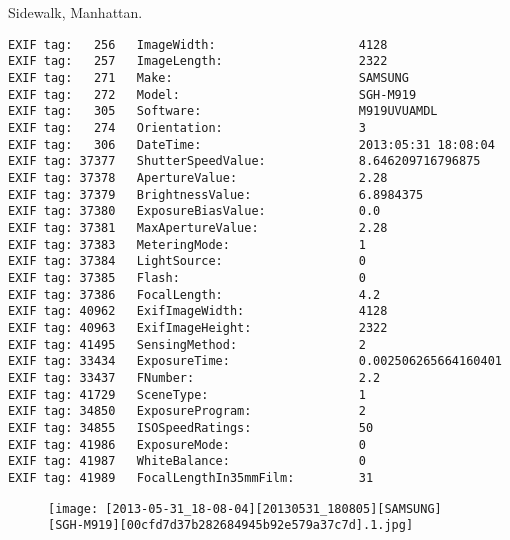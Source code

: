 \section{\protect{}}
\noindent Sidewalk, Manhattan.
\noindent
\begin{lstlisting}
EXIF tag:   256   ImageWidth:                    4128
EXIF tag:   257   ImageLength:                   2322
EXIF tag:   271   Make:                          SAMSUNG
EXIF tag:   272   Model:                         SGH-M919
EXIF tag:   305   Software:                      M919UVUAMDL
EXIF tag:   274   Orientation:                   3
EXIF tag:   306   DateTime:                      2013:05:31 18:08:04
EXIF tag: 37377   ShutterSpeedValue:             8.646209716796875
EXIF tag: 37378   ApertureValue:                 2.28
EXIF tag: 37379   BrightnessValue:               6.8984375
EXIF tag: 37380   ExposureBiasValue:             0.0
EXIF tag: 37381   MaxApertureValue:              2.28
EXIF tag: 37383   MeteringMode:                  1
EXIF tag: 37384   LightSource:                   0
EXIF tag: 37385   Flash:                         0
EXIF tag: 37386   FocalLength:                   4.2
EXIF tag: 40962   ExifImageWidth:                4128
EXIF tag: 40963   ExifImageHeight:               2322
EXIF tag: 41495   SensingMethod:                 2
EXIF tag: 33434   ExposureTime:                  0.002506265664160401
EXIF tag: 33437   FNumber:                       2.2
EXIF tag: 41729   SceneType:                     1
EXIF tag: 34850   ExposureProgram:               2
EXIF tag: 34855   ISOSpeedRatings:               50
EXIF tag: 41986   ExposureMode:                  0
EXIF tag: 41987   WhiteBalance:                  0
EXIF tag: 41989   FocalLengthIn35mmFilm:         31

\end{lstlisting}
\clearpage
\begin{figure}
\raggedleft
\texttt{[image: [2013-05-31\_18-08-04][20130531\_180805][SAMSUNG][SGH-M919][00cfd7d37b282684945b92e579a37c7d].1.jpg]}
\end{figure}


\clearpage
